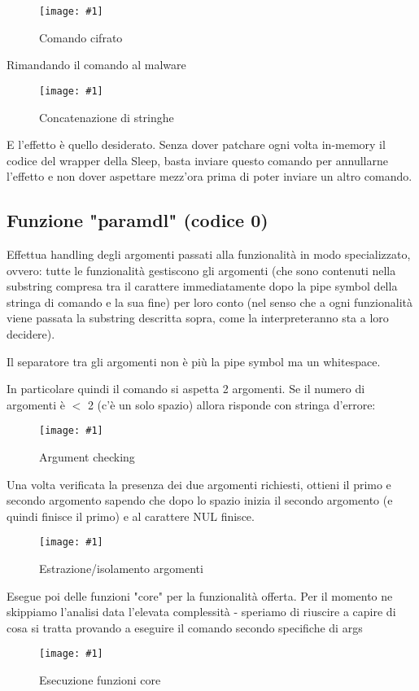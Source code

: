 \documentclass[
    a4paper, %
    11pt %
]{article}
\newcommand{\pic}[4]{\begin{figure}[H]
            \centering
            \texttt{[image: \#1]}
            \caption{#2}
            \label{fig:#1}
            \end{figure}}
\begin{document}
            \pic{adv_edit_enc}{Comando cifrato}{6cm}{2.5cm}

            Rimandando il comando al malware

            \pic{adv_2_ans}{Concatenazione di stringhe}{18cm}{1.5cm}

            E l'effetto è quello desiderato. Senza dover patchare ogni volta in-memory il codice del wrapper
            della Sleep, basta inviare questo comando per annullarne l'effetto e non dover aspettare mezz'ora
            prima di poter inviare un altro comando.

            \subsection{Funzione "paramdl" (codice 0)}\label{sect:paramdl}

            Effettua handling degli argomenti passati alla funzionalità in modo specializzato, ovvero:
            tutte le funzionalità gestiscono gli argomenti (che sono contenuti nella substring compresa tra 
            il carattere immediatamente dopo la pipe symbol della stringa di comando e la sua fine) per loro 
            conto (nel senso che a ogni funzionalità viene passata la substring descritta sopra, come la 
            interpreteranno sta a loro decidere).
            
            Il separatore tra gli argomenti non è più la pipe symbol ma un whitespace.
            
            In particolare quindi il comando si aspetta 2 argomenti.
            Se il numero di argomenti è $<$ 2 (c'è un solo spazio) allora risponde con stringa d'errore:

            \pic{adv_0_check}{Argument checking}{19cm}{7cm}

            Una volta verificata la presenza dei due argomenti richiesti, ottieni il primo e secondo
            argomento sapendo che dopo lo spazio inizia il secondo argomento (e quindi finisce il primo) e
            al carattere NUL finisce.

            \pic{adv_0_checkok}{Estrazione/isolamento argomenti}{19cm}{7cm}

            Esegue poi delle funzioni "core" per la funzionalità offerta. Per il momento ne skippiamo l'analisi
            data l'elevata complessità - speriamo di riuscire a capire di cosa si tratta provando a eseguire
            il comando secondo specifiche di args

            \pic{adv_0_core}{Esecuzione funzioni core}{13cm}{3cm}
\end{document}
